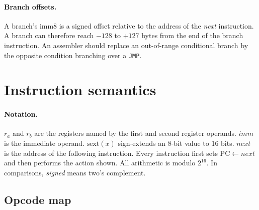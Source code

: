\documentclass[11pt,a4paper]{article}
\newcommand{\op}[1]{\texttt{#1}}
\newcommand{\sx}{\mathrm{sext}}
\newcommand{\R}[1]{r_{#1}}
\begin{document}
\paragraph{Branch offsets.} A branch's imm8 is a signed offset relative to
the address of the \emph{next} instruction. A branch can therefore reach $-128$
to $+127$ bytes from the end of the branch instruction. An assembler should
replace an out-of-range conditional branch by the opposite condition
branching over a \op{JMP}.

\section{Instruction semantics}\label{sec:semantics}

\paragraph{Notation.}
$\R{a}$ and $\R{b}$ are the registers named by the first and second register
operands. $\mathit{imm}$ is the immediate operand. $\sx(x)$ sign-extends an
8-bit value to 16 bits. $\mathit{next}$ is the address of the following
instruction. Every instruction first sets $\mathrm{PC}\gets\mathit{next}$ and
then performs the action shown. All arithmetic is modulo $2^{16}$. In
comparisons, \emph{signed} means two's complement.

\subsection{Opcode map}
\end{document}
